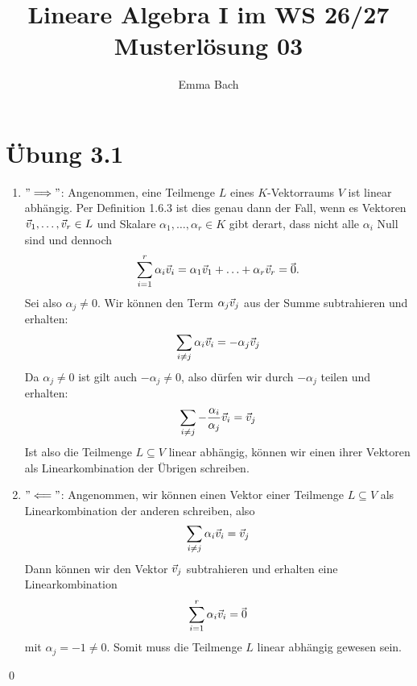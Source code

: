 \documentclass{article}
\begin{document}
\title{\Huge\vspace{-1.5cm}\textbf{Lineare Algebra I im WS 26/27\\Musterlösung 03}}
\author{Emma Bach}

\maketitle

\section*{Übung 3.1}
\separator


\begin{enumerate}
	\item $"\Longrightarrow"$:
	Angenommen, eine Teilmenge $L$ eines $K$-Vektorraums $V$ ist linear abhängig. Per Definition 1.6.3 ist dies genau dann der Fall, wenn es Vektoren $\vec{v}_1, \hdots, \vec{v}_r \in L$ und Skalare $\alpha_1, \hdots, \alpha_r \in K$ gibt derart, dass nicht alle $\alpha_i$ Null sind und dennoch
	\begin{align*}
		\sum_{i = 1}^r \alpha_i \vec{v}_i = \alpha_1 \vec{v}_1 + \hdots + \alpha_r \vec{v}_r = \kern-1.2pt\vec{\kern1.2pt 0}.
	\end{align*}
	Sei also $\alpha_j \neq 0$. Wir können den Term $\alpha_j \vec{v}_j$ aus der Summe subtrahieren und erhalten:
	\begin{align*}
		\sum_{i \neq j} \alpha_i \vec{v}_i = - \alpha_j \vec{v}_j
	\end{align*}
	Da $\alpha_j \neq 0$ ist gilt auch $-\alpha_j \neq 0$, also dürfen wir durch $-\alpha_j$ teilen und erhalten:
	\begin{align*}
		\sum_{i \neq j} -\frac{\alpha_i}{\alpha_j} \vec{v}_i = \vec{v}_j
	\end{align*}
	Ist also die Teilmenge $L \subseteq V$ linear abhängig, können wir einen ihrer Vektoren als Linearkombination der Übrigen schreiben.
	\item $"\Longleftarrow"$: Angenommen, wir können einen Vektor einer Teilmenge $L \subseteq V$ als Linearkombination der anderen schreiben, also
	\begin{align*}
		\sum_{i \neq j} \alpha_i \vec{v}_i = \vec{v}_j
	\end{align*}
	Dann können wir den Vektor $\vec{v}_j$ subtrahieren und erhalten eine Linearkombination 
	\begin{align*}
		\sum_{i = 1}^r \alpha_i \vec{v}_i = \kern-1.2pt\vec{\kern1.2pt 0}
	\end{align*}
	mit $\alpha_j = -1 \neq 0$. Somit muss die Teilmenge $L$ linear abhängig gewesen sein.
\end{enumerate}
\qed
\clearpage
\end{document}
